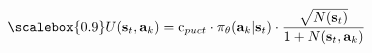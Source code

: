 \vspace{-0.2cm}
\begin{equation}
\scalebox{0.9}

U(\textbf{s}_t, \textbf{a}_k) = \textrm{c}_{puct} \cdot \pi_{\theta}(\textbf{a}_k|\textbf{s}_t)\cdot\frac{\sqrt{N(\textbf{s}_t)}}{1 + N(\textbf{s}_t, \textbf{a}_k)}
\label{eq:u_func}
\end{equation}